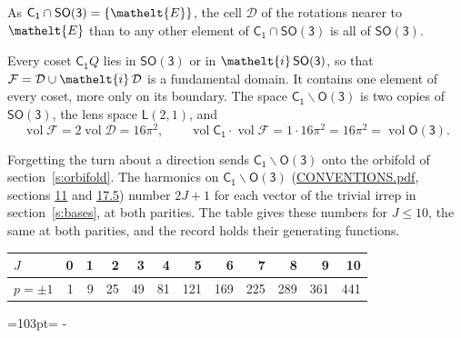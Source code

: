 \documentclass[10pt,a4paper]{article}
\newcommand{\needspace}[1]{\par\penalty-100\begingroup\dimen0=#1\relax\dimen2=\pagegoal
  \advance\dimen2-\pagetotal\ifdim\dimen0>\dimen2\relax\ifdim\dimen2>0pt\vfil\break\fi\fi
  \endgroup}
\numberwithin{equation}{section}
\newcommand{\eltfont}[1]{{\let\sigma\eltsigma\mathelt{#1}}}
\newcommand{\grp}[1]{\mathsf{#1}}
\newcommand{\elt}[1]{\eltfont{#1}}
\newcommand{\vol}{\operatorname{vol}}
\newcommand{\fcell}{\mathcal{D}}
\newcommand{\fdomain}{\mathcal{F}}
\newcommand{\lensspace}[2]{\mathsf{L}(#1, #2)}
\begin{document}
\leavevmode\label{n:set.cell}As $\grp{C_{1}} \cap \grp{SO(3)} = \{\elt{E}\}$, the cell $\fcell$ of the rotations nearer to $\elt{E}$ than to any other element of $\grp{C_{1}} \cap \grp{SO(3)}$ is all of \href{SO3.pdf}{$\grp{SO(3)}$}.

\leavevmode\label{n:set.fundamental}Every coset $\grp{C_{1}}Q$ lies in \href{SO3.pdf}{$\grp{SO(3)}$} or in $\elt{i}\,\grp{SO(3)}$, so that $\fdomain = \fcell \cup \elt{i}\,\fcell$ is a fundamental domain. It contains one element of every coset, more only on its boundary.
\leavevmode\label{n:set.lens}The space $\grp{C_{1}}\backslash\grp{O(3)}$ is two copies of \href{SO3.pdf}{$\grp{SO(3)}$}, the lens space $\lensspace{2}{1}$, and
\begin{equation}\label{e:volume}\vol\fdomain = 2\vol\fcell = 16\pi^2,\qquad \vol\grp{C_{1}}\cdot\vol\fdomain = 1\cdot 16\pi^2 = 16\pi^2 = \vol\grp{O(3)}.\end{equation}

Forgetting the turn about a direction sends $\grp{C_{1}}\backslash\grp{O(3)}$ onto the orbifold of section~\ref{s:orbifold}.
The harmonics on $\grp{C_{1}}\backslash\grp{O(3)}$ (\href{../../CONVENTIONS.pdf}{CONVENTIONS.pdf}, sections \href{../../CONVENTIONS.pdf\#conv.11}{11} and \href{../../CONVENTIONS.pdf\#conv.17.5}{17.5}) number $2J + 1$ for each vector of the trivial irrep in section~\ref{s:bases}, at both parities. The table gives these numbers for $J \le 10$, the same at both parities, and the record holds their generating functions.
{\small\setlength{\tabcolsep}{4pt}\begin{longtable}{@{}lrrrrrrrrrrr@{}}\toprule
$J$ & 0 & 1 & 2 & 3 & 4 & 5 & 6 & 7 & 8 & 9 & 10\\\midrule\endhead
\bottomrule\endfoot\endlastfoot
$p = \pm 1$ & 1 & 9 & 25 & 49 & 81 & 121 & 169 & 225 & 289 & 361 & 441\\
\bottomrule\end{longtable}}
\needspace{103pt}
\end{document}
